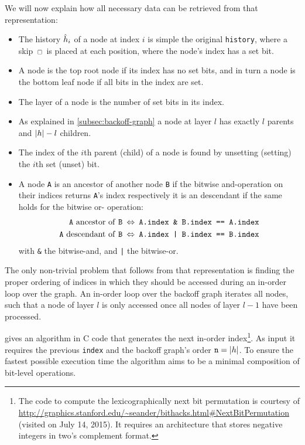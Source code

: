 We will now explain how all necessary data can be retrieved from that
representation:
\begin{itemize}
  \setlength{\itemsep}{0.4ex}
  \item The history $\DerivedHistory[i]$ of a node at index $i$ is simple
    the original \texttt{history}, where a skip $\Skp$ is placed at each
    position, where the node's index has a set bit.
  \item A node is the top root node if its index has no set bits, and in turn a
    node is the bottom leaf node if all bits in the index are set.
  \item The layer of a node is the number of set bits in its index.
  \item As explained in \cref{subsec:backoff-graph} a node at layer $l$ has
    exactly $l$ parents and ${\left|h\right|} - l$ children.
  \item The index of the $i$th parent (child) of a node is found by unsetting
    (setting) the $i$th set (unset) bit.
  \item A node \texttt{A} is an ancestor of another node \texttt{B}
    if the bitwise and-operation on their indices returns \texttt{A}'s index
    respectively it is an descendant if the same holds for the bitwise or-
    operation:
    \begin{align*}
      \text{\texttt{A} ancestor of \texttt{B}} \: &\Leftrightarrow \: \texttt{A.index \& B.index == A.index} \\
      \text{\texttt{A} descendant of \texttt{B}} \: &\Leftrightarrow \: \texttt{A.index | B.index == B.index}
    \end{align*}
    with \texttt{\&} the bitwise-and, and \texttt{|} the bitwise-or.
\end{itemize}

The only non-trivial problem that follows from that representation is finding
the proper ordering of indices in which they should be accessed during an
in-order loop over the graph.
An in-order loop over the backoff graph iterates all nodes, such that a node
of layer $l$ is only accessed once all nodes of layer $l-1$ have been processed.

 gives an algorithm in C code that generates the
next in-order index\footnote{The code to compute the lexicographically next bit
permutation is courtesy of
\mbox{\url{http://graphics.stanford.edu/~seander/bithacks.html\#NextBitPermutation}}
(visited on July 14, 2015).
It requires an architecture that stores negative integers in two's complement
format.}.
As input it requires the previous \texttt{index} and the backoff graph's order
$\texttt{n} = {\left|h\right|}$.
To ensure the fastest possible execution time the algorithm aims to be a minimal
composition of bit-level operations.

